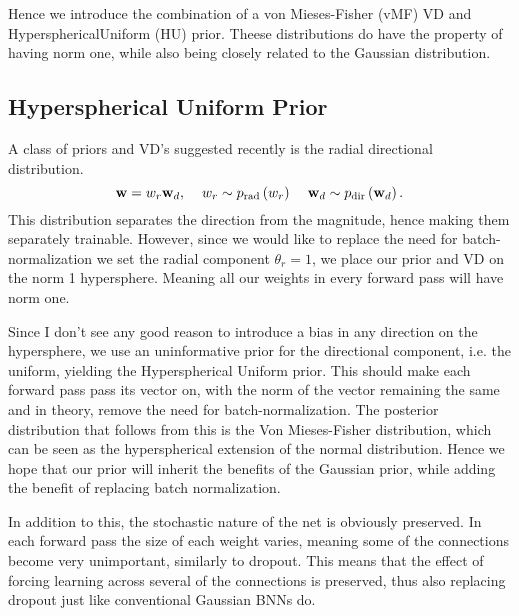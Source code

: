 \documentclass[nofootinbib,UKenglish,nobalancelastpage,12pt]{article}
\newcommand{\vect}{\ensuremath{\mathbf}}
\begin{document}
Hence we introduce the combination of a von Mieses-Fisher (vMF) VD and HypersphericalUniform (HU) prior. Theese distributions do have the property of having norm one, while also being closely related to the Gaussian distribution.

\subsection{Hyperspherical Uniform Prior}
A class of priors and VD's suggested recently is the radial directional distribution. \cite{Vincent_review}
\begin{equation}
    \vect{w} = w_r\vect{w}_d, \hspace{4mm} w_r \sim p_{\text{rad}}\left(w_r\right) \hspace{4mm} \vect{w}_d \sim p_{\text{dir}}\left(\vect{w}_d \right).
\end{equation}
This distribution separates the direction from the magnitude, hence making them separately trainable. However, since we would like to replace the need for batch-normalization we set the radial component $\theta_r = 1$, we place our prior and VD on the norm 1 hypersphere. Meaning all our weights in every forward pass will have norm one.

Since I don't see any good reason to introduce a bias in any direction on the hypersphere, we use an uninformative prior for the directional component, i.e. the uniform, yielding the Hyperspherical Uniform prior. This should make each forward pass pass its vector on, with the norm of the vector remaining the same and in theory, remove the need for batch-normalization. The posterior distribution that follows from this is the Von Mieses-Fisher distribution, which can be seen as the hyperspherical extension of the normal distribution. Hence we hope that our prior will inherit the benefits of the Gaussian prior, while adding the benefit of replacing batch normalization.

In addition to this, the stochastic nature of the net is obviously preserved. In each forward pass the size of each weight varies, meaning some of the connections become very unimportant, similarly to dropout. This means that the effect of forcing learning across several of the connections is preserved, thus also replacing dropout just like conventional Gaussian BNNs do.
\end{document}
